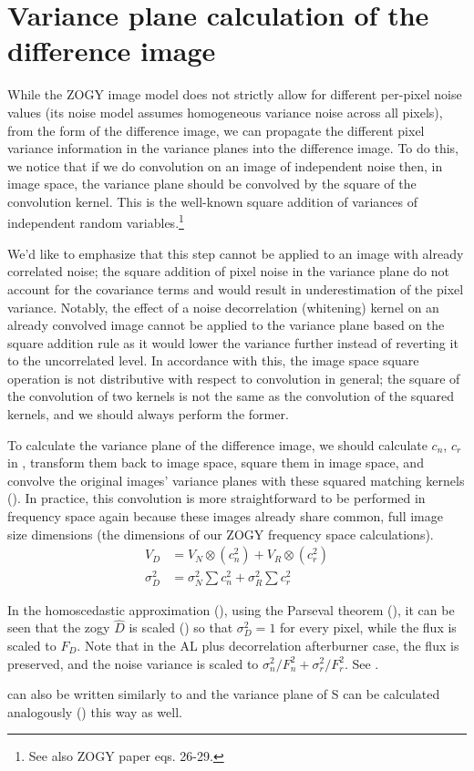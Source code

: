 \section{Variance plane calculation of the difference image\label{sec:varplane}}
\par While the ZOGY image model does not strictly allow for different
per-pixel noise values (its noise model assumes homogeneous variance
noise across all pixels), from the  form of the
difference image, we can propagate the different pixel variance
information in the variance planes into the difference image. To do
this, we notice that if we do convolution on an image of independent
noise then, in image space, the variance plane should be convolved by
the square of the convolution kernel. This is the well-known square
addition of variances of independent random variables.\footnote{See
  also ZOGY paper eqs. 26-29.}
%
\par We'd like to emphasize that this step cannot be applied to an
image with already correlated noise; the square addition of pixel
noise in the variance plane do not account for the covariance terms
and would result in underestimation of the pixel
variance. Notably, the effect of a noise decorrelation
(whitening) kernel on an already convolved image cannot be applied to
the variance plane based on the square addition rule as it would lower
the variance further instead of reverting it to the uncorrelated
level. In accordance with this, the image space square operation is
not distributive with respect to convolution in general; the square of the
convolution of two kernels is not the same as the convolution of the
squared kernels, and we should always perform the former.
%
\par To calculate the variance plane of the difference image, we
should calculate \(c_n\), \(c_r\) in , transform them
back to image space, square them in image space, and convolve the
original images' variance planes with these squared matching kernels
(). In practice, this convolution is more
straightforward to be performed in frequency space again because these
images already share common, full image size dimensions (the
dimensions of our ZOGY frequency space calculations).
\begin{align}
  V_D &= V_N \otimes \left(c_n^2\right) + V_R \otimes \left(c_r^2\right)\label{eq:VarD}\\
  \sigma_D^2 &= \sigma_N^2 \sum c_n^2 + \sigma_R^2 \sum c_r^2\label{eq:sigmaD} 
\end{align}
%
\par In the homoscedastic approximation (), using the
Parseval theorem (), it can be seen that the zogy
\(\hat{D}\) is scaled () so that \(\sigma_D^2 = 1\) for
every pixel, while the flux is scaled to \(F_D\). Note that in the AL
plus decorrelation afterburner case, the flux is preserved, and the
noise variance is scaled to \(\sigma_n^2 / F_n^2 + \sigma_r^2
/F_r^2\). See .
%
\par {} can also be written similarly to 
and the variance plane of S can be calculated analogously
() this way as well.
%
